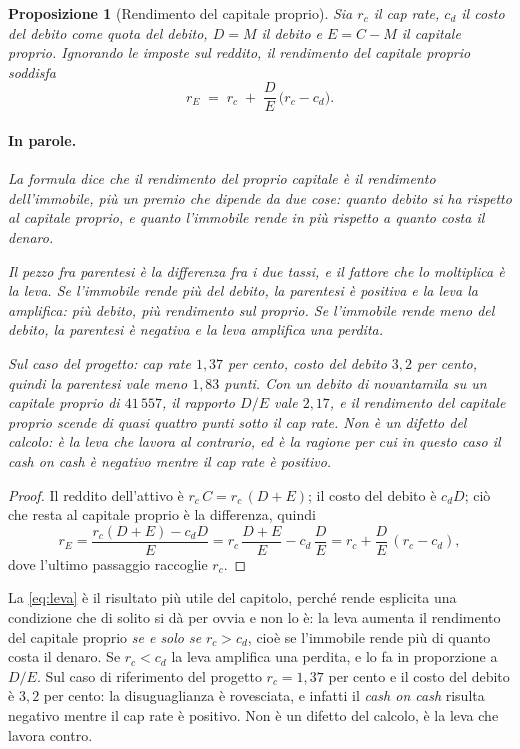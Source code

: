 \documentclass[11pt,a4paper]{article}
\theoremstyle{definition}
\theoremstyle{plain}
\newtheorem{proposizione}[definizione]{Proposizione}
\begin{document}
\begin{proposizione}[Rendimento del capitale proprio]
Sia $r_c$ il cap rate, $c_d$ il costo del debito come quota del debito, $D=M$ il debito e $E=C-M$ il capitale proprio. Ignorando le imposte sul reddito, il rendimento del capitale proprio soddisfa
\begin{equation}
r_E \;=\; r_c \;+\; \frac{D}{E}\,\big(r_c - c_d\big).
\label{eq:leva}
\end{equation}

\paragraph{In parole.} La formula dice che il rendimento del proprio capitale è il rendimento dell'immobile, più un premio che dipende da due cose: quanto debito si ha rispetto al capitale proprio, e quanto l'immobile rende in più rispetto a quanto costa il denaro.

Il pezzo fra parentesi è la differenza fra i due tassi, e il fattore che lo moltiplica è la leva. Se l'immobile rende più del debito, la parentesi è positiva e la leva la amplifica: più debito, più rendimento sul proprio. Se l'immobile rende meno del debito, la parentesi è negativa e la leva amplifica una perdita.

Sul caso del progetto: cap rate $1{,}37$ per cento, costo del debito $3{,}2$ per cento, quindi la parentesi vale meno $1{,}83$ punti. Con un debito di novantamila su un capitale proprio di $41\,557$, il rapporto $D/E$ vale $2{,}17$, e il rendimento del capitale proprio scende di quasi quattro punti sotto il cap rate. Non è un difetto del calcolo: è la leva che lavora al contrario, ed è la ragione per cui in questo caso il cash on cash è negativo mentre il cap rate è positivo.
\end{proposizione}

\begin{proof}
Il reddito dell'attivo è $r_c\,C = r_c\,(D+E)$; il costo del debito è $c_d D$; ciò che resta al capitale proprio è la differenza, quindi
\[
r_E = \frac{r_c(D+E) - c_d D}{E} = r_c\,\frac{D+E}{E} - c_d\,\frac{D}{E}
= r_c + \frac{D}{E}\,(r_c - c_d),
\]
dove l'ultimo passaggio raccoglie $r_c$.
\end{proof}

La \eqref{eq:leva} è il risultato più utile del capitolo, perché rende esplicita una condizione che di solito si dà per ovvia e non lo è: la leva aumenta il rendimento del capitale proprio \emph{se e solo se} $r_c > c_d$, cioè se l'immobile rende più di quanto costa il denaro. Se $r_c < c_d$ la leva amplifica una perdita, e lo fa in proporzione a $D/E$. Sul caso di riferimento del progetto $r_c = 1{,}37$ per cento e il costo del debito è $3{,}2$ per cento: la disuguaglianza è rovesciata, e infatti il \emph{cash on cash} risulta negativo mentre il cap rate è positivo. Non è un difetto del calcolo, è la leva che lavora contro.
\end{document}
